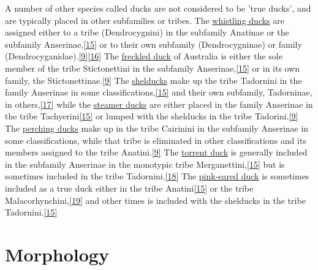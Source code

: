 \documentclass[11pt,a4paper]{article}
\begin{document}
A number of other species called ducks are not considered to be 'true ducks', and are typically placed in other subfamilies or tribes. The \href{/wiki/Whistling\_duck}{whistling ducks} are assigned either to a tribe (Dendrocygnini) in the subfamily Anatinae or the subfamily Anserinae,\href{\#cite\_note-FOOTNOTECarboneras1992537-15}{[15]} or to their own subfamily (Dendrocygninae) or family (Dendrocyganidae).\href{\#cite\_note-FOOTNOTECarboneras1992540-9}{[9]}\href{\#cite\_note-FOOTNOTEAmerican\_Ornithologists'\_Union1998xix-16}{[16]} The \href{/wiki/Freckled\_duck}{freckled duck} of Australia is either the sole member of the tribe Stictonettini in the subfamily Anserinae,\href{\#cite\_note-FOOTNOTECarboneras1992537-15}{[15]} or in its own family, the Stictonettinae.\href{\#cite\_note-FOOTNOTECarboneras1992540-9}{[9]} The \href{/wiki/Shelduck}{shelducks} make up the tribe Tadornini in the family Anserinae in some classifications,\href{\#cite\_note-FOOTNOTECarboneras1992537-15}{[15]} and their own subfamily, Tadorninae, in others,\href{\#cite\_note-FOOTNOTEAmerican\_Ornithologists'\_Union1998-17}{[17]} while the \href{/wiki/Steamer\_duck}{steamer ducks} are either placed in the family Anserinae in the tribe Tachyerini\href{\#cite\_note-FOOTNOTECarboneras1992537-15}{[15]} or lumped with the shelducks in the tribe Tadorini.\href{\#cite\_note-FOOTNOTECarboneras1992540-9}{[9]} The \href{/wiki/Perching\_duck}{perching ducks} make up in the tribe Cairinini in the subfamily Anserinae in some classifications, while that tribe is eliminated in other classifications and its members assigned to the tribe Anatini.\href{\#cite\_note-FOOTNOTECarboneras1992540-9}{[9]} The \href{/wiki/Torrent\_duck}{torrent duck} is generally included in the subfamily Anserinae in the monotypic tribe Merganettini,\href{\#cite\_note-FOOTNOTECarboneras1992537-15}{[15]} but is sometimes included in the tribe Tadornini.\href{\#cite\_note-FOOTNOTECarboneras1992538-18}{[18]} The \href{/wiki/Pink-eared\_duck}{pink-eared duck} is sometimes included as a true duck either in the tribe Anatini\href{\#cite\_note-FOOTNOTECarboneras1992537-15}{[15]} or the tribe Malacorhynchini,\href{\#cite\_note-FOOTNOTEChristidisBoles200862-19}{[19]} and other times is included with the shelducks in the tribe Tadornini.\href{\#cite\_note-FOOTNOTECarboneras1992537-15}{[15]}

\section{Morphology}
\end{document}

